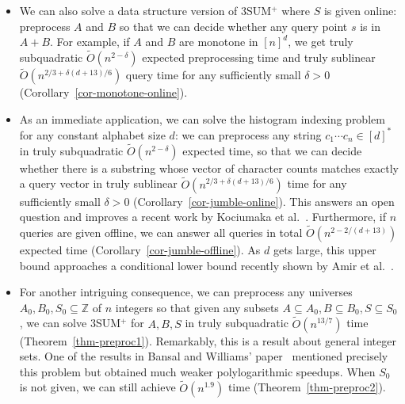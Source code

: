 \documentclass[11pt]{article}
\newcommand{\LONG}[1]{#1}\newcommand{\SHORT}[1]{}
\newcommand{\Z}{\mathbb{Z}}
\newcommand{\OO}{\widetilde{O}}
\begin{document}
\begin{itemize}
\item We can also solve a data structure version of 3SUM$^+$ where
$S$ is given online:
preprocess $A$ and $B$ so that we can decide whether
any query point $s$ is in $A+B$.
For example, if $A$ and $B$ are monotone in $[n]^d$,
we get truly subquadratic $\OO(n^{2-\delta})$ expected
preprocessing time and truly sublinear $\OO(n^{2/3+\delta(d+13)/6})$
query time for any sufficiently small $\delta>0$
(\LONG{Corollary~\ref{cor-monotone-online}}\SHORT{see the full paper}).
\item
As an immediate application,
we can solve the histogram indexing problem for any constant alphabet size $d$: we can preprocess any string $c_1\cdots c_n\in [d]^*$ in truly
subquadratic $\OO(n^{2-\delta})$ expected time, so that we can decide
whether there is a substring whose vector of character counts
matches exactly a query vector in truly sublinear
$\OO(n^{2/3+\delta(d+13)/6})$ time for any sufficiently
small $\delta>0$ (\LONG{Corollary~\ref{cor-jumble-online}}\SHORT{see the full paper}).
This answers an open question and improves a
recent work by Kociumaka et al.~\cite{KRR13}.
Furthermore, if $n$ queries are given offline, we can answer all queries in total $\OO(n^{2-2/(d+13)})$ expected time
(Corollary~\ref{cor-jumble-offline}).
As $d$ gets large,
this upper bound approaches a conditional lower bound recently
shown by Amir et al.~\cite{ACLL14}.
\item
For another intriguing consequence, we can preprocess
any universes $A_0,B_0,S_0\subseteq\Z$ of $n$ integers so that given any subsets
$A\subseteq A_0,B\subseteq B_0, S\subseteq S_0$, we can solve 3SUM$^+$ for $A,B,S$ in truly subquadratic
$\OO(n^{13/7})$ time (\LONG{Theorem~\ref{thm-preproc1}}\SHORT{see the full paper}).  Remarkably, this is a result about
general integer sets.  One of the results in
Bansal and Williams' paper~\cite{BW12} mentioned precisely
this problem but obtained much weaker polylogarithmic speedups.
When $S_0$ is not given, we can still achieve $\OO(n^{1.9})$ time
(\LONG{Theorem~\ref{thm-preproc2}}\SHORT{see the full paper}).
\end{itemize}
\end{document}
